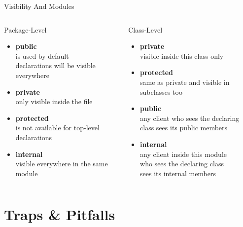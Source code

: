 \begin{frame}[fragile]{Visibility And Modules}
	\begin{columns}
		\begin{column}{0.45\textwidth}
			Package-Level
			\begin{itemize}
				\item \textbf{public}\\
				is used by default\\
				declarations will be visible everywhere
				\item \textbf{private}\\
				only visible inside the file
				\item \textbf{protected}\\
				is not available for top-level declarations
				\item \textbf{internal}\\
				visible everywhere in the same module
			\end{itemize}
		\end{column}
		\begin{column}{0.55\textwidth}
			Class-Level
			\begin{itemize}
				\item \textbf{private}\\
				visible inside this class only
				\item \textbf{protected}\\
				same as private and visible in subclasses too
				\item \textbf{public}\\
				any client who sees the declaring\\
				class sees its public members
				\item \textbf{internal}\\
				any client inside this module\\
				who sees the declaring class\\
				sees its internal members
			\end{itemize}
		\end{column}
	\end{columns}
\end{frame}


\section{Traps \& Pitfalls}

